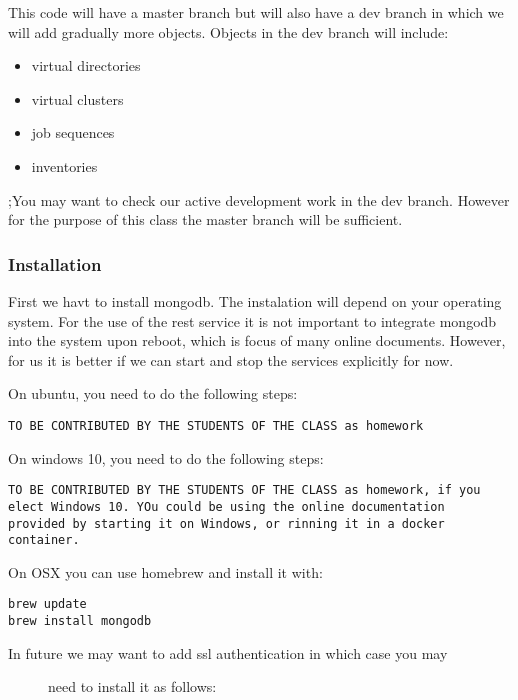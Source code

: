 This code will have a master branch but will also have a dev branch in
which we will add gradually more objects. Objects in the dev branch will
include:

\begin{itemize}
\tightlist
\item
  virtual directories
\item
  virtual clusters
\item
  job sequences
\item
  inventories
\end{itemize}

;You may want to check our active development work in the dev branch.
However for the purpose of this class the master branch will be
sufficient.

\subsubsection{Installation}\label{installation}

First we havt to install mongodb. The instalation will depend on your
operating system. For the use of the rest service it is not important to
integrate mongodb into the system upon reboot, which is focus of many
online documents. However, for us it is better if we can start and stop
the services explicitly for now.

On ubuntu, you need to do the following steps:

\begin{verbatim}
TO BE CONTRIBUTED BY THE STUDENTS OF THE CLASS as homework
\end{verbatim}

On windows 10, you need to do the following steps:

\begin{verbatim}
TO BE CONTRIBUTED BY THE STUDENTS OF THE CLASS as homework, if you
elect Windows 10. YOu could be using the online documentation
provided by starting it on Windows, or rinning it in a docker container.
\end{verbatim}

On OSX you can use homebrew and install it with:

\begin{verbatim}
brew update
brew install mongodb
\end{verbatim}

\begin{description}
\item[In future we may want to add ssl authentication in which case you
may]
need to install it as follows:
\end{description}

